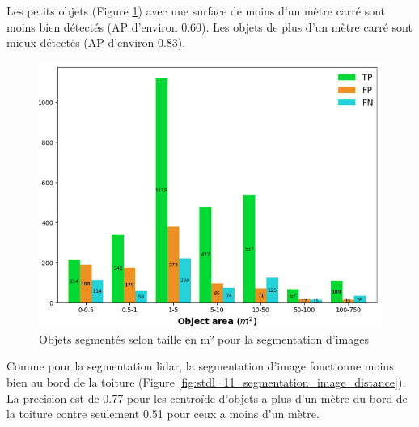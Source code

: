 \par{Les petits objets (Figure \ref{fig:stdl_10_segmentation_image_taille}) avec une surface de moins d'un mètre carré sont moins bien détectés (AP d'environ 0.60). Les objets de plus d'un mètre carré sont mieux détectés (AP d'environ 0.83).}
\begin{figure}[H]
    \centering
    \includegraphics[width=1\linewidth]{02-main//figures/ch2/stdl_10_segmentation_image_taille.png}
    \caption{Objets segmentés selon taille en m² pour la segmentation d’images \cite{herny_detection_2024}}
    \label{fig:stdl_10_segmentation_image_taille}
\end{figure}
\newpage
\par{Comme pour la segmentation \gls{lidar}, la segmentation d'image fonctionne moins bien au bord de la toiture (Figure \ref{fig:stdl_11_segmentation_image_distance}). La precision est de 0.77 pour les centroïde d'objets a plus d'un mètre du bord de la toiture contre seulement 0.51 pour ceux a moins d'un mètre.}

